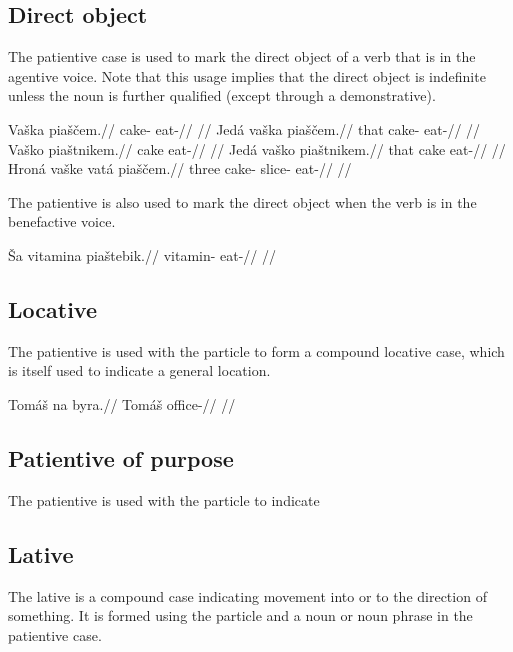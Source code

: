 \subsection{Direct object}
The patientive case is used to mark the direct object of a verb that is in the agentive voice. Note that this usage implies that the direct object is indefinite unless the noun is further qualified (except through a demonstrative).

\pex
\a
\begingl
\gla Va\v{s}ka pia\v{s}\v{c}em.//
\glb cake- eat-//
\glft {}//
\endgl
\a
\begingl
\gla Jed\'a va\v{s}ka pia\v{s}\v{c}em.//
\glb that cake- eat-//
\glft {}//
\endgl
\a
\begingl
\gla Va\v{s}ko pia\v{s}tnikem.//
\glb cake eat-//
\glft {}//
\endgl
\a
\begingl
\gla Jed\'a va\v{s}ko pia\v{s}tnikem.//
\glb that cake eat-//
\glft {}//
\endgl
\a
\begingl
\gla Hron\'a va\v{s}ke vat\'a pia\v{s}\v{c}em.//
\glb three cake- slice- eat-//
\glft {}//
\endgl
\xe

The patientive is also used to mark the direct object when the verb is in the benefactive voice.

\pex
\begingl
\gla \v{S}a vitamina pia\v{s}tebik.//
\glb {} vitamin- eat-//
\glft {}//
\endgl
\xe



\subsection{Locative}

The patientive is used with the particle  to form a compound locative case, which is itself used to indicate a general location.

\pex
\begingl
\gla Tom\'a\v{s} na byra.//
\glb Tom\'a\v{s}  office-//
\glft {}//
\endgl
\xe

\subsection{Patientive of purpose}

The patientive is used with the particle  to indicate

\subsection{Lative}
The lative is a compound case indicating movement into or to the direction of something. It is formed using the particle  and a noun or noun phrase in the patientive case.

